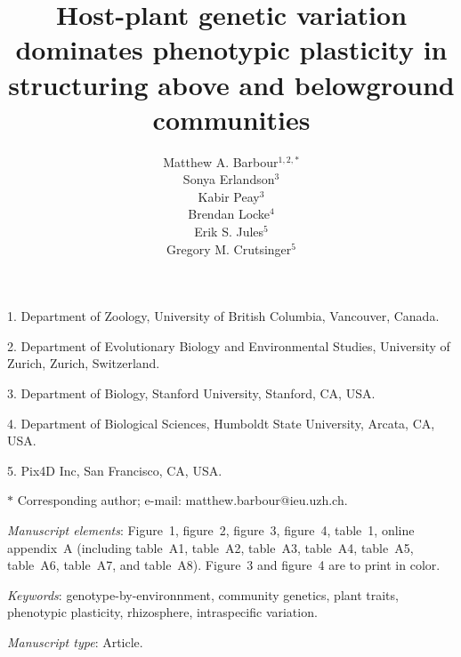\documentclass[11pt]{article}
\title{Host-plant genetic variation dominates phenotypic plasticity in structuring above and belowground communities}
\author{Matthew A. Barbour$^{1,2,\ast}$ \\ 
Sonya Erlandson$^3$ \\ 
Kabir Peay$^3$ \\
Brendan Locke$^4$ \\
Erik S. Jules$^5$ \\
Gregory M. Crutsinger$^5$}
\date{}
\begin{document}
\maketitle

\noindent{}1. Department of Zoology, University of British Columbia, Vancouver, Canada.

\noindent{}2. Department of Evolutionary Biology and Environmental Studies, University of Zurich, Zurich, Switzerland.

\noindent{}3. Department of Biology, Stanford University, Stanford, CA, USA.

\noindent{}4. Department of Biological Sciences, Humboldt State University, Arcata, CA, USA.

\noindent{}5. Pix4D Inc, San Francisco, CA, USA.

\noindent{}$\ast$ Corresponding author; e-mail: matthew.barbour@ieu.uzh.ch.


\bigskip

\textit{Manuscript elements}: Figure~1, figure~2, figure~3, figure~4, table~1, online
appendix~A (including table~A1, table~A2, table~A3, table~A4, table~A5, table~A6, table~A7, and table~A8). Figure~3 and figure~4 are to print in color.

\bigskip

\textit{Keywords}: genotype-by-environnment, community genetics,  plant traits, phenotypic plasticity, rhizosphere, intraspecific variation.

\bigskip

\textit{Manuscript type}: Article. 

\bigskip


\linenumbers{}
\modulolinenumbers[3]

\newpage{}
\end{document}
